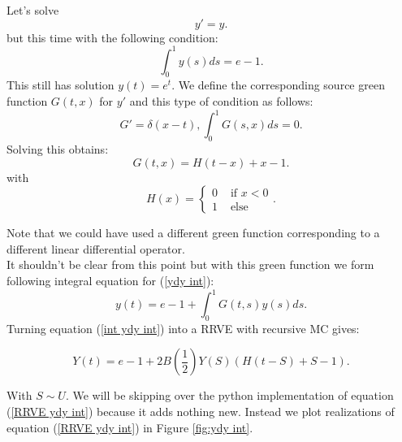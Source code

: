 \documentclass[a4paper,12pt]{article}
\begin{document}
\begin{example}[$y'=y$]
    Let's solve
    \begin{equation} \label{ydy int}
        y'=y.
    \end{equation}
    but this time with the following condition:
    \[
        \int_{0}^{1} y(s) ds = e-1
        .\]
    This still has solution $y(t)=e^{t}$. We define the corresponding source
    green function $G(t,x)$ for $y'$ and this type of condition as follows:
    \[
        G'= \delta(x-t), \int_{0}^{1}G(s,x)ds = 0
        .\]
    Solving this obtains:
    \[
        G(t,x) = H(t-x) +x-1
        .\]
    with
    \[
        H(x) = \begin{cases}
            0 & \text{ if } x<0 \\
            1 & \text{ else }
        \end{cases}
        .\]

    Note that we could have used a different green function corresponding
    to a different linear differential operator. \\

    It shouldn't be clear from this point but with this green
    function we form following integral equation for (\ref{ydy int}):
    \begin{equation} \label{int ydy int}
        y(t)= e -1 + \int_{0}^{1}G(t,s)y(s)ds.
    \end{equation}
    Turning equation (\ref{int ydy int}) into a RRVE with recursive MC gives:

    \begin{equation}\label{RRVE ydy int}
        Y(t)= e-1 + 2B\left(\frac{1}{2} \right)Y(S)(H(t-S)+S-1) .
    \end{equation}

    With $S \sim U$. We will be skipping over the python implementation of equation (\ref{RRVE ydy int})
    because it adds nothing new.
    Instead we plot realizations of equation (\ref{RRVE ydy int}) in Figure \ref{fig:ydy int}.


\end{example}
\end{document}
